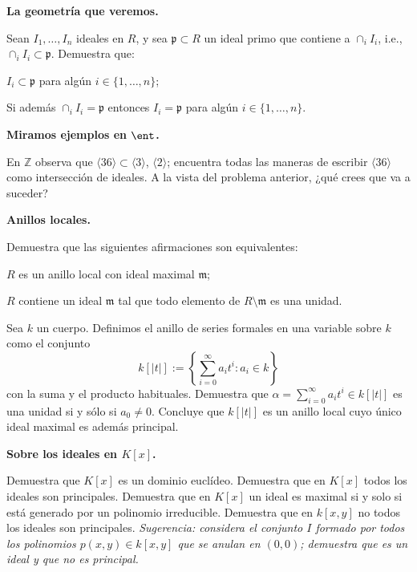 \begin{problem}
{\bfseries La geometría que veremos.}

Sean $I_1,\ldots, I_n$ ideales en $R$, y sea $\mathfrak p \subset R$ un ideal primo que contiene a
$\cap_iI_i$, i.e., $\cap_iI_i\subset \mathfrak p$. Demuestra que:

\ppart $I_i\subset \mathfrak p$ para algún $i\in \{1,\ldots,n\}$;

\ppart Si además  $\cap_iI_i=\mathfrak p$ entonces $I_i=\mathfrak p$ para algún $i\in \{1,\ldots,n\}$.

\solution
\end{problem}

\begin{problem}
{\bfseries Miramos ejemplos en $\ent$.}

En ${\mathbb Z}$ observa que $\langle 36\rangle \subset \langle 3\rangle$, $\langle 2\rangle$;
encuentra todas las maneras de escribir $\langle 36\rangle$ como intersección de ideales. A la vista del problema anterior,  ¿qué crees que va a suceder?
\solution
\end{problem}

\begin{problem}
{\bfseries Anillos locales.}

Demuestra que las siguientes afirmaciones son equivalentes:

\ppart $R$ es un anillo local con ideal maximal $\mathfrak m$;

\ppart $R$ contiene un ideal  $\mathfrak m$ tal que todo elemento de $R\setminus \mathfrak m$ es una unidad.
\solution
\end{problem}

\begin{problem}
Sea $k$ un cuerpo. Definimos el anillo de series formales en una variable sobre $k$ como el conjunto
$$k[|t|]:=\left\{\sum_{i=0}^{\infty}a_it^i: a_i\in k\right\}$$
con la suma y el producto habituales. Demuestra que $\alpha=\sum_{i=0}^{\infty}a_it^i
  \in k[|t|] $ es una unidad si y sólo si $a_0\neq 0$. Concluye que $k[|t|]$ es un anillo local cuyo único ideal maximal es además  principal.
\solution
\end{problem}

\noindent {}

\begin{problem}
{\bfseries Sobre los ideales en $K[x]$.}

\ppart Demuestra que $K[x]$ es un dominio euclídeo.
\ppart Demuestra que en $K[x]$ todos los ideales son principales.
\ppart Demuestra que en $K[x]$ un ideal es maximal si y solo si está generado por un polinomio irreducible.
\ppart Demuestra que en $k[x,y]$ no todos los ideales son principales. {\em Sugerencia: considera el conjunto $I$ formado por todos los polinomios $p(x,y)\in k[x,y]$ que se anulan en $(0,0)$; demuestra que es un ideal y que no es principal.}
\solution
\end{problem}

